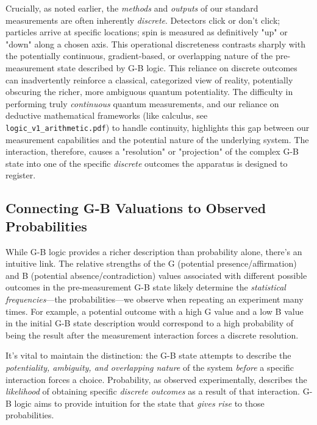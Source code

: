 \documentclass{article}
\begin{document}
Crucially, as noted earlier, the \textit{methods} and \textit{outputs} of our standard measurements are often inherently \textit{discrete}. Detectors click or don't click; particles arrive at specific locations; spin is measured as definitively "up" or "down" along a chosen axis. This operational discreteness contrasts sharply with the potentially continuous, gradient-based, or overlapping nature of the pre-measurement state described by G-B logic. This reliance on discrete outcomes can inadvertently reinforce a classical, categorized view of reality, potentially obscuring the richer, more ambiguous quantum potentiality. The difficulty in performing truly \textit{continuous} quantum measurements, and our reliance on deductive mathematical frameworks (like calculus, see \texttt{logic\_v1\_arithmetic.pdf}) to handle continuity, highlights this gap between our measurement capabilities and the potential nature of the underlying system. The interaction, therefore, causes a "resolution" or "projection" of the complex G-B state into one of the specific \textit{discrete} outcomes the apparatus is designed to register.

\subsection{Connecting G-B Valuations to Observed Probabilities}

While G-B logic provides a richer description than probability alone, there's an intuitive link. The relative strengths of the G (potential presence/affirmation) and B (potential absence/contradiction) values associated with different possible outcomes in the pre-measurement G-B state likely determine the \textit{statistical frequencies}---the probabilities---we observe when repeating an experiment many times. For example, a potential outcome with a high G value and a low B value in the initial G-B state description would correspond to a high probability of being the result after the measurement interaction forces a discrete resolution.

It's vital to maintain the distinction: the G-B state attempts to describe the \textit{potentiality, ambiguity, and overlapping nature} of the system \textit{before} a specific interaction forces a choice. Probability, as observed experimentally, describes the \textit{likelihood} of obtaining specific \textit{discrete outcomes} as a result of that interaction. G-B logic aims to provide intuition for the state that \textit{gives rise} to those probabilities.
\end{document}
